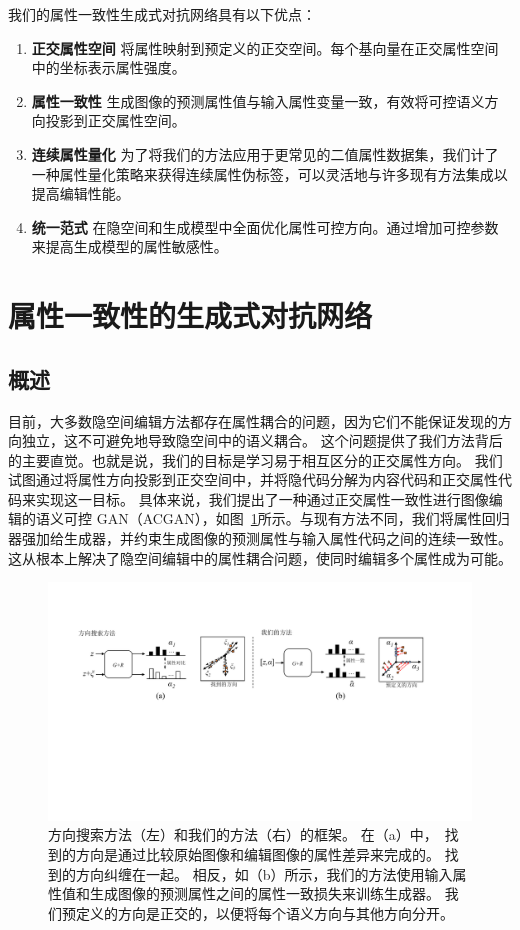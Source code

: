 我们的属性一致性生成式对抗网络具有以下优点：
\begin{enumerate}
    \item \textbf{正交属性空间} 将属性映射到预定义的正交空间。每个基向量在正交属性空间中的坐标表示属性强度。
    \item \textbf{属性一致性} 生成图像的预测属性值与输入属性变量一致，有效将可控语义方向投影到正交属性空间。
    \item \textbf{连续属性量化} 为了将我们的方法应用于更常见的二值属性数据集，我们计了一种属性量化策略来获得连续属性伪标签，可以灵活地与许多现有方法集成以提高编辑性能。
    \item \textbf{统一范式} 在隐空间和生成模型中全面优化属性可控方向。通过增加可控参数来提高生成模型的属性敏感性。
\end{enumerate}

\section{属性一致性的生成式对抗网络}

\subsection{概述}
目前，大多数隐空间编辑方法都存在属性耦合的问题，因为它们不能保证发现的方向独立，这不可避免地导致隐空间中的语义耦合。
这个问题提供了我们方法背后的主要直觉。也就是说，我们的目标是学习易于相互区分的正交属性方向。
我们试图通过将属性方向投影到正交空间中，并将隐代码分解为内容代码和正交属性代码来实现这一目标。
具体来说，我们提出了一种通过正交属性一致性进行图像编辑的语义可控 GAN（ACGAN），如图~\ref{fig:framework}所示。与现有方法不同，我们将属性回归器强加给生成器，并约束生成图像的预测属性与输入属性代码之间的连续一致性。
这从根本上解决了隐空间编辑中的属性耦合问题，使同时编辑多个属性成为可能。

\begin{figure}
    \centering
    \includegraphics[width=1\linewidth]{figures/ACGAN/framework.pdf}
    \caption{方向搜索方法（左）和我们的方法（右）的框架。 在（a）中，~\cite{icml2020, iclr2021}找到的方向是通过比较原始图像和编辑图像的属性差异来完成的。 找到的方向纠缠在一起。 相反，如（b）所示，我们的方法使用输入属性值和生成图像的预测属性之间的属性一致损失来训练生成器。 我们预定义的方向是正交的，以便将每个语义方向与其他方向分开。}
    \label{fig:framework}
  \end{figure}

